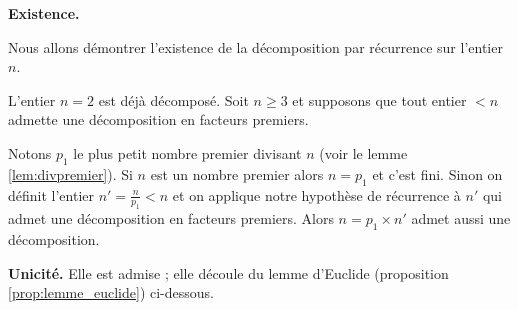 
\medskip
\textbf{Existence.}

\smallskip
Nous allons démontrer l'existence de la décomposition par récurrence sur l'entier $n$.

L'entier $n=2$ est déjà décomposé. Soit $n \geqslant 3$ et supposons que
tout entier $< n$ admette une décomposition en facteurs premiers.

\smallskip
Notons $p_1$ le plus petit nombre premier divisant $n$ (voir le lemme \ref{lem:divpremier}).
Si $n$ est un nombre premier alors $n=p_1$ et c'est fini. Sinon
on définit l'entier $n'= \frac{n}{p_1} < n$ et on applique notre hypothèse de récurrence
à $n'$ qui admet une décomposition en facteurs premiers. Alors $n = p_ 1 \times n'$ admet aussi
une décomposition.

\medskip
\textbf{Unicité.} Elle est admise ; elle découle du lemme d'Euclide (proposition \ref{prop:lemme_euclide}) ci-dessous.

\bigskip

%
%
%
%
%
%



